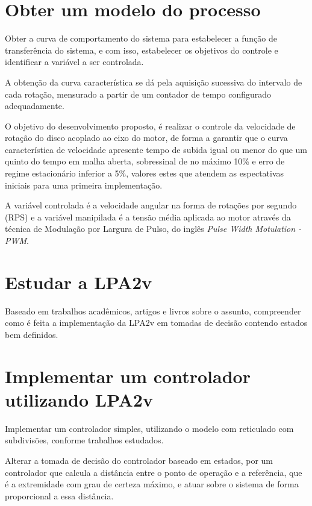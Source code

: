 \section{ Obter um modelo do processo }
Obter a curva de comportamento do sistema para 
estabelecer a função de transferência do sistema,  
e com isso, 
estabelecer os objetivos do controle e 
identificar a variável a ser controlada.


A obtenção da curva característica se dá 
pela aquisição sucessiva do intervalo de cada rotação, 
mensurado a partir de um contador de tempo configurado adequadamente. 


O objetivo do desenvolvimento proposto, 
é realizar o controle da velocidade de rotação do disco acoplado ao eixo do motor, 
de forma a garantir que o curva característica de velocidade apresente
tempo de subida igual ou menor do que um quinto do tempo em malha aberta, 
sobressinal de no máximo 10\% e erro de regime estacionário inferior a 5\%, 
valores estes que atendem as espectativas iniciais para uma primeira implementação.


A variável controlada é a velocidade angular na forma de rotações por segundo (RPS) e a variável manipilada é a tensão média aplicada ao motor através da técnica de Modulação por Largura de Pulso, do inglês \emph{Pulse Width Motulation - PWM}.



\section{ Estudar a LPA2v }

Baseado em trabalhos acadêmicos, artigos e livros sobre o assunto, compreender como é feita a implementação da LPA2v em tomadas de decisão contendo estados bem definidos.

\section{ Implementar um controlador utilizando LPA2v}

Implementar um controlador simples, utilizando o modelo com reticulado com subdivisões, conforme trabalhos estudados. 

Alterar a tomada de decisão do  controlador baseado em estados, por um controlador que calcula a distância entre o ponto de operação e a referência, que é a extremidade com grau de certeza máximo, e atuar sobre o sistema de forma proporcional a essa distância.


